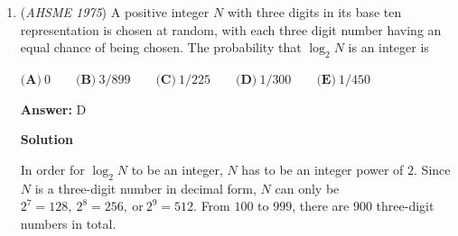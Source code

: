 \begin{enumerate}
 \textbf{Answer: }D



\textbf{Solution 1}

Each day the man takes $2$ trips: a trip to work and a trip back home.  Since the man took $8 + 15 + 9 = 32$ trips, he worked $32 \div 2 = \boxed{\textbf{(D)}\ 16}$ days.

 



\textbf{Solution 2}

The man has three possible combinations of transportation:
 \[\text{Morning train, Afternoon bus (m.t., a.b.)}\]
 \[\text{Morning bus, Afternoon train (m.b., a.t.)}\]
 \[\text{Morning bus, Afternoon bus (m.b, a.b.)}\].

 
Let $y$ be the number of times the man takes the $\text{a.t.}$. Then, $9-y$ is the number of times he takes the $\text{m.t.}$. Keep in mind that $\text{m.b.}=y$ and $\text{a.b.}=9-y$.

 
Let $z$ be the number of times the man takes the $\text{m.b.}$ and $\text{a.b.}$. Now, we get the two equations 
 \[y+z=8\] and 
 \[9-y+z=15.\]

 Solving the system of equations, we get $y=1$ and $z=7$.

 
So during the $x$ working days, the man took the $\text{(m.t., a.b.)}$ on $9-1=8$ days, the $\text{(m.b., a.t.)}$ on $1$ day, and the $\text{(m.b., a.b.)}$ on  $7$ days.

 
Therefore, $x=8+1+7= \boxed{\textbf{(D)}\ 16}$. ~\href{https://artofproblemsolving.com/wiki/index.php?title=User:Jiang147369}{jiang147369}

 


 


	\item (\textit{AHSME 1975}) A positive integer $N$ with three digits in its base ten representation is chosen at random, 
with each three digit number having an equal chance of being chosen. The probability that $\log_2 N$ is an integer is 


 $\textbf{(A)}\ 0 \qquad  \textbf{(B)}\ 3/899 \qquad  \textbf{(C)}\ 1/225 \qquad  \textbf{(D)}\ 1/300 \qquad  \textbf{(E)}\ 1/450$

 \textbf{Answer: }D



\textbf{Solution}

In order for $\log_2 N$ to be an integer, $N$ has to be an integer power of $2$. Since $N$ is a three-digit number in decimal form, $N$ can only be $2^{7} = 128,\ 2^{8} = 256,\ \text{or}\ 2^{9} = 512$. From $100$ to $999$, there are $900$ three-digit numbers in total.


\end{enumerate}
